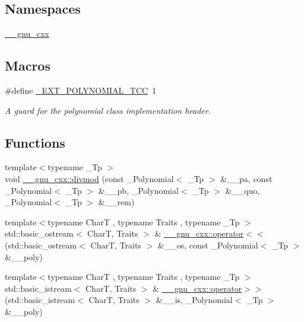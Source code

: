 \subsection*{Namespaces}
\begin{DoxyCompactItemize}
\item 
 \hyperlink{namespace____gnu__cxx}{\+\_\+\+\_\+gnu\+\_\+cxx}
\end{DoxyCompactItemize}
\subsection*{Macros}
\begin{DoxyCompactItemize}
\item 
\#define \hyperlink{polynomial_8tcc_af5a65c717a211a48a4cf31df10b4537a}{\+\_\+\+E\+X\+T\+\_\+\+P\+O\+L\+Y\+N\+O\+M\+I\+A\+L\+\_\+\+T\+CC}~1
\begin{DoxyCompactList}\small\item\em A guard for the polynomial class implementation header. \end{DoxyCompactList}\end{DoxyCompactItemize}
\subsection*{Functions}
\begin{DoxyCompactItemize}
\item 
{\footnotesize template$<$typename \+\_\+\+Tp $>$ }\\void \hyperlink{namespace____gnu__cxx_abe506cf34c921c378a681f0de31d49a5}{\+\_\+\+\_\+gnu\+\_\+cxx\+::divmod} (const \+\_\+\+Polynomial$<$ \+\_\+\+Tp $>$ \&\+\_\+\+\_\+pa, const \+\_\+\+Polynomial$<$ \+\_\+\+Tp $>$ \&\+\_\+\+\_\+pb, \+\_\+\+Polynomial$<$ \+\_\+\+Tp $>$ \&\+\_\+\+\_\+quo, \+\_\+\+Polynomial$<$ \+\_\+\+Tp $>$ \&\+\_\+\+\_\+rem)
\item 
{\footnotesize template$<$typename CharT , typename Traits , typename \+\_\+\+Tp $>$ }\\std\+::basic\+\_\+ostream$<$ CharT, Traits $>$ \& \hyperlink{namespace____gnu__cxx_ad713743dbfc30fba653621d1f7e99d3c}{\+\_\+\+\_\+gnu\+\_\+cxx\+::operator$<$$<$} (std\+::basic\+\_\+ostream$<$ CharT, Traits $>$ \&\+\_\+\+\_\+os, const \+\_\+\+Polynomial$<$ \+\_\+\+Tp $>$ \&\+\_\+\+\_\+poly)
\item 
{\footnotesize template$<$typename CharT , typename Traits , typename \+\_\+\+Tp $>$ }\\std\+::basic\+\_\+istream$<$ CharT, Traits $>$ \& \hyperlink{namespace____gnu__cxx_acf7d03318756578d08f672212cd91234}{\+\_\+\+\_\+gnu\+\_\+cxx\+::operator$>$$>$} (std\+::basic\+\_\+istream$<$ CharT, Traits $>$ \&\+\_\+\+\_\+is, \+\_\+\+Polynomial$<$ \+\_\+\+Tp $>$ \&\+\_\+\+\_\+poly)
\end{DoxyCompactItemize}
